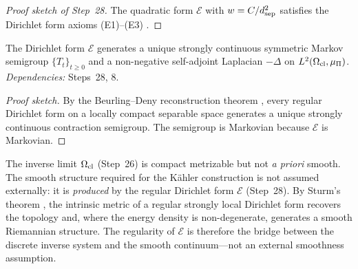\begin{proof}[Proof sketch of Step~28]
The quadratic form $\mathcal{E}$ with $w = C/d_{\mathrm{sep}}^2$ satisfies the
Dirichlet form axioms (E1)--(E3) \citep{fukushima2011}.
\end{proof}



\begin{theorem}
\label{thm:semigroup-laplacian}
The Dirichlet form $\mathcal{E}$ generates a unique strongly continuous
symmetric Markov semigroup $\{T_t\}_{t \geq 0}$ and a non-negative
self-adjoint Laplacian $-\Delta$ on $L^2(\Omega_{\mathrm{cl}}, \mu_\Pi)$.
\emph{Dependencies:} Steps~28, 8.
\begin{proof}[Proof sketch]
By the Beurling--Deny reconstruction theorem \citep{beurling1959}, every
regular Dirichlet form on a locally compact separable space generates a
unique strongly continuous contraction semigroup.  The semigroup is
Markovian because $\mathcal{E}$ is Markovian.
\end{proof}
\end{theorem}

\begin{remark}
\label{rem:smoothness}
The inverse limit $\Omega_{\mathrm{cl}}$ (Step~26) is compact metrizable but not
\emph{a priori} smooth.  The smooth structure required for the K\"{a}hler
construction is not assumed externally: it is \emph{produced} by the
regular Dirichlet form $\mathcal{E}$ (Step~28).  By Sturm's theorem
\citep{sturm1994}, the intrinsic metric of a regular strongly local
Dirichlet form recovers the topology and, where the energy density is
non-degenerate, generates a smooth Riemannian structure.  The regularity
of $\mathcal{E}$ is therefore the bridge between the discrete inverse
system and the smooth continuum---not an external smoothness assumption.
\end{remark}

